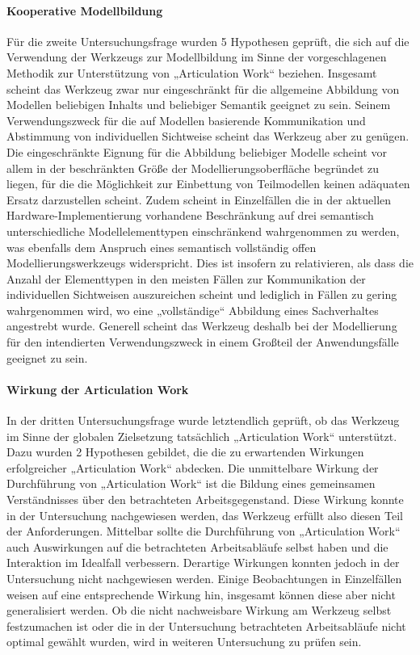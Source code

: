\paragraph{Kooperative Modellbildung} %
Für die zweite Untersuchungsfrage wurden 5 Hypothesen geprüft, die sich auf die Verwendung der Werkzeugs zur Modellbildung im Sinne der vorgeschlagenen Methodik zur Unterstützung von „Articulation Work“ beziehen. Insgesamt scheint das Werkzeug zwar nur eingeschränkt für die allgemeine Abbildung von Modellen beliebigen Inhalts und beliebiger Semantik geeignet zu sein. Seinem Verwendungszweck für die auf Modellen basierende Kommunikation und Abstimmung von individuellen Sichtweise scheint das Werkzeug aber zu genügen. Die eingeschränkte Eignung für die Abbildung beliebiger Modelle scheint vor allem in der beschränkten Größe der Modellierungsoberfläche begründet zu liegen, für die die Möglichkeit zur Einbettung von Teilmodellen keinen adäquaten Ersatz darzustellen scheint. Zudem scheint in Einzelfällen die in der aktuellen Hardware-Implementierung vorhandene Beschränkung auf drei semantisch unterschiedliche Modellelementtypen einschränkend wahrgenommen zu werden, was ebenfalls dem Anspruch eines semantisch vollständig offen Modellierungswerkzeugs widerspricht. Dies ist insofern zu relativieren, als dass die Anzahl der Elementtypen in den meisten Fällen zur Kommunikation der individuellen Sichtweisen auszureichen scheint und lediglich in Fällen zu gering wahrgenommen wird, wo eine „vollständige“ Abbildung eines Sachverhaltes angestrebt wurde. Generell scheint das Werkzeug deshalb bei der Modellierung für den intendierten Verwendungszweck in einem Großteil der Anwendungsfälle geeignet zu sein.

\paragraph{Wirkung der Articulation Work} %
In der dritten Untersuchungsfrage wurde letztendlich geprüft, ob das Werkzeug im Sinne der globalen Zielsetzung tatsächlich „Articulation Work“ unterstützt. Dazu wurden 2 Hypothesen gebildet, die die zu erwartenden Wirkungen erfolgreicher „Articulation Work“ abdecken. Die unmittelbare Wirkung der Durchführung von „Articulation Work“ ist die Bildung eines gemeinsamen Verständnisses über den betrachteten Arbeitsgegenstand. Diese Wirkung konnte in der Untersuchung nachgewiesen werden, das Werkzeug erfüllt also diesen Teil der Anforderungen. Mittelbar sollte die Durchführung von „Articulation Work“ auch Auswirkungen auf die betrachteten Arbeitsabläufe selbst haben und die Interaktion im Idealfall verbessern. Derartige Wirkungen konnten jedoch in der Untersuchung nicht nachgewiesen werden. Einige Beobachtungen in Einzelfällen weisen auf eine entsprechende Wirkung hin, insgesamt können diese aber nicht generalisiert werden. Ob die nicht nachweisbare Wirkung am Werkzeug selbst festzumachen ist oder die in der Untersuchung betrachteten Arbeitsabläufe nicht optimal gewählt wurden, wird in weiteren Untersuchung zu prüfen sein.

